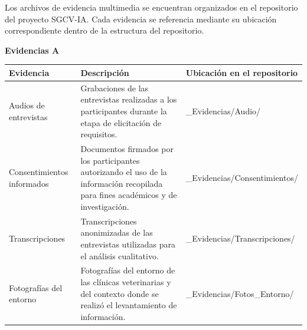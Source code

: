 \documentclass[
]{article}
\newcounter{none} %
\begin{document}
Los archivos de evidencia multimedia se encuentran organizados en el
repositorio del proyecto SGCV-IA. Cada evidencia se referencia mediante
su ubicación correspondiente dentro de la estructura del repositorio.

\textbf{Evidencias A}

{\def\LTcaptype{none}
\begin{longtable}[]{@{}
  >{\raggedright\arraybackslash}p{}
  >{\raggedright\arraybackslash}p{}
  >{\raggedright\arraybackslash}p{}@{}}

\toprule\noalign{}

\begin{minipage}[b]{\linewidth}\centering
\textbf{Evidencia}
\end{minipage}
&
\begin{minipage}[b]{\linewidth}\centering
\textbf{Descripción}
\end{minipage}
&
\begin{minipage}[b]{\linewidth}\centering
\textbf{Ubicación en el repositorio}
\end{minipage}
\\

\midrule\noalign{}
\endhead

\bottomrule\noalign{}
\endlastfoot

Audios de entrevistas
&
Grabaciones de las entrevistas realizadas a los participantes durante
la etapa de elicitación de requisitos.
&
02\_\allowbreak Evidencias/\allowbreak Audio/\allowbreak 
\\

Consentimientos informados
&
Documentos firmados por los participantes autorizando el uso de la
información recopilada para fines académicos y de investigación.
&
02\_\allowbreak Evidencias/\allowbreak Consentimientos/\allowbreak 
\\

Transcripciones
&
Transcripciones anonimizadas de las entrevistas utilizadas para el
análisis cualitativo.
&
02\_\allowbreak Evidencias/\allowbreak Transcripciones/\allowbreak 
\\

Fotografías del entorno
&
Fotografías del entorno de las clínicas veterinarias y del contexto
donde se realizó el levantamiento de información.
&
02\_\allowbreak Evidencias/\allowbreak Fotos\_\allowbreak Entorno/\allowbreak 
\\


\end{longtable}}
\end{document}
